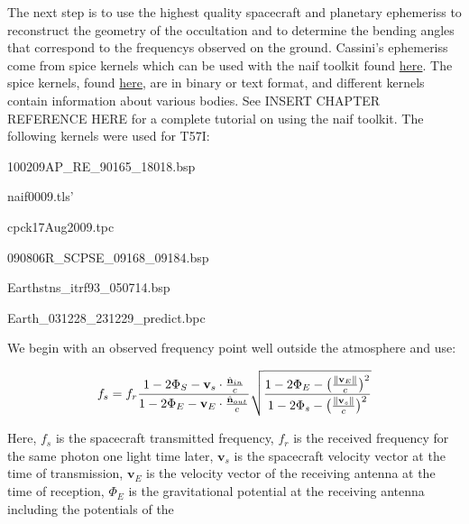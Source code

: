 \documentclass[oneside]{book}
\theoremstyle{mystyle}
\DeclarePairedDelimiter\norm{\lVert}{\rVert}
\begin{document}
The next step is to use the highest quality spacecraft and planetary \glspl{ephemeris} to reconstruct the geometry of the \gls{occultation} and to determine the \glspl{bending angle} that correspond to the \glspl{frequency} observed on the ground. Cassini's \glspl{ephemeris} come from \gls{spice} \glspl{kernel} which can be used with the \gls{naif} toolkit found \href{ftp://naif.jpl.nasa.gov/pub/naif/toolkit}{here}. The \gls{spice} \glspl{kernel}, found \href{ftp://naif.jpl.nasa.gov/pub/naif/CASSINI/kernels}{here}, are in binary or text format, and different \glspl{kernel} contain information about various bodies. See INSERT CHAPTER REFERENCE HERE for a complete tutorial on using the \gls{naif} toolkit. The following \glspl{kernel} were used for T57I:

\begin{itemize}[itemsep=0pt]
\begin{multicols}{2}
    \item 100209AP\_RE\_90165\_18018.bsp
    \item naif0009.tls'
    \item cpck17Aug2009.tpc
    \item 090806R\_SCPSE\_09168\_09184.bsp
    \item Earthstns\_itrf93\_050714.bsp
    \item Earth\_031228\_231229\_predict.bpc
\end{multicols}
\end{itemize}

\noindent We begin with an observed frequency point well outside the atmosphere and use:

\begin{equation}
f_{s} = f_{r}\frac{1-2\Phi_{S}-\mathbf{v}_{s}\cdot \frac{\hat{\mathbf{n}}_{in}}{c}}{1-2\Phi_{E}-\mathbf{v}_{E}\cdot \frac{\hat{\mathbf{n}}_{out}}{c}}\sqrt{\frac{1-2\Phi_{E} - \big(\frac{\norm{\mathbf{v}_{E}}}{c}\big)^2}{1-2\Phi_{s}-\big(\frac{\norm{\mathbf{v}_{s}}}{c}\big)^2}}
\end{equation}

\noindent Here, $f_s$ is the spacecraft transmitted frequency, $f_r$ is the received frequency for the same photon one light time later, $\mathbf{v}_s$ is the spacecraft velocity vector at the time of transmission, $\mathbf{v}_{E}$ is the velocity vector of the receiving antenna at the time of reception, $\Phi_{E}$ is the gravitational potential at the receiving antenna including the potentials of the 
\end{document}
